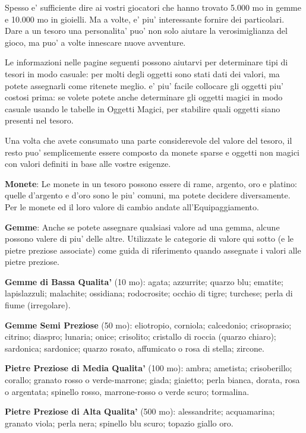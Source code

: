 \documentclass[a4paper,11pt,twoside,openany]{dndbook}
\begin{document}
Spesso e' sufficiente dire ai vostri giocatori che hanno trovato 5.000
mo in gemme e 10.000 mo in gioielli. Ma a volte, e' piu' interessante
fornire dei particolari. Dare a un tesoro una personalita' puo' non
solo aiutare la verosimiglianza del gioco, ma puo' a volte innescare
nuove avventure.

Le informazioni nelle pagine seguenti possono aiutarvi per determinare tipi di tesori in modo casuale: per molti degli oggetti sono stati dati dei valori, ma potete assegnarli come ritenete meglio. e' piu' facile collocare gli oggetti piu' costosi prima: se volete potete anche determinare gli oggetti magici in modo casuale usando le tabelle in Oggetti Magici, per stabilire quali oggetti siano presenti nel tesoro.

Una volta che avete consumato una parte considerevole del valore del tesoro, il resto puo' semplicemente essere composto da monete sparse e oggetti non magici con valori definiti in base alle vostre esigenze.

\textbf{Monete}: Le monete in un tesoro possono essere di rame, argento, oro e platino: quelle d'argento e d'oro sono le piu' comuni, ma potete decidere diversamente. Per le monete ed il loro valore di cambio andate all'Equipaggiamento.

\textbf{Gemme}: Anche se potete assegnare qualsiasi valore ad una gemma, alcune possono valere di piu' delle altre. Utilizzate le categorie di valore qui sotto (e le pietre preziose associate) come guida di riferimento quando assegnate i valori alle pietre preziose.

\textbf{Gemme di Bassa Qualita'} (10 mo): agata; azzurrite; quarzo blu; ematite; lapislazzuli; malachite; ossidiana; rodocrosite; occhio di tigre; turchese; perla di fiume (irregolare).

\textbf{Gemme Semi Preziose} (50 mo): eliotropio, corniola; calcedonio; crisoprasio; citrino; diaspro; lunaria; onice; crisolito; cristallo di roccia (quarzo chiaro); sardonica; sardonice; quarzo rosato, affumicato o rosa di stella; zircone.

\textbf{Pietre Preziose di Media Qualita'} (100 mo): ambra; ametista;
crisoberillo; corallo; granato rosso o verde-marrone; giada; giaietto;
perla bianca, dorata, rosa o argentata; spinello rosso, marrone-rosso
o verde scuro; tormalina.

\textbf{Pietre Preziose di Alta Qualita'} (500 mo): alessandrite; acquamarina; granato viola; perla nera; spinello blu scuro; topazio giallo oro.
\end{document}
